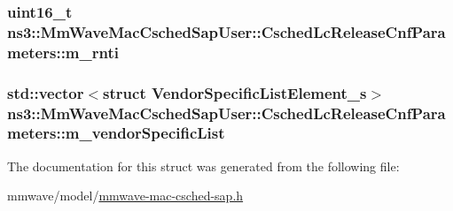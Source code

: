 \subsubsection[{\texorpdfstring{m\+\_\+rnti}{m_rnti}}]{\setlength{\rightskip}{0pt plus 5cm}uint16\+\_\+t ns3\+::\+Mm\+Wave\+Mac\+Csched\+Sap\+User\+::\+Csched\+Lc\+Release\+Cnf\+Parameters\+::m\+\_\+rnti}\hypertarget{structns3_1_1MmWaveMacCschedSapUser_1_1CschedLcReleaseCnfParameters_a4aadbcc95bbe53096bbb33eabade5756}{}\label{structns3_1_1MmWaveMacCschedSapUser_1_1CschedLcReleaseCnfParameters_a4aadbcc95bbe53096bbb33eabade5756}
\subsubsection[{\texorpdfstring{m\+\_\+vendor\+Specific\+List}{m_vendorSpecificList}}]{\setlength{\rightskip}{0pt plus 5cm}std\+::vector$<$struct {\bf Vendor\+Specific\+List\+Element\+\_\+s}$>$ ns3\+::\+Mm\+Wave\+Mac\+Csched\+Sap\+User\+::\+Csched\+Lc\+Release\+Cnf\+Parameters\+::m\+\_\+vendor\+Specific\+List}\hypertarget{structns3_1_1MmWaveMacCschedSapUser_1_1CschedLcReleaseCnfParameters_a33dd9a85f828e6da75e6ae1f8ee02f56}{}\label{structns3_1_1MmWaveMacCschedSapUser_1_1CschedLcReleaseCnfParameters_a33dd9a85f828e6da75e6ae1f8ee02f56}


The documentation for this struct was generated from the following file\+:\begin{DoxyCompactItemize}
\item 
mmwave/model/\hyperlink{mmwave-mac-csched-sap_8h}{mmwave-\/mac-\/csched-\/sap.\+h}\end{DoxyCompactItemize}
